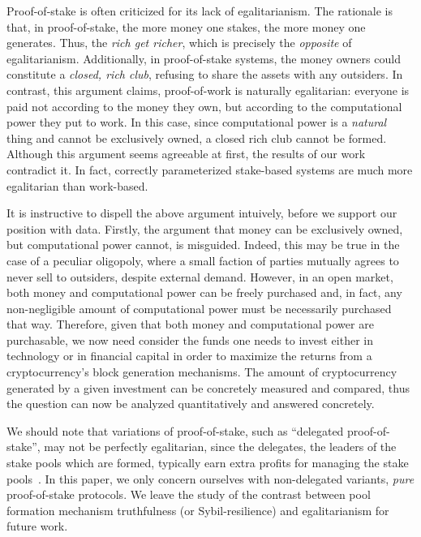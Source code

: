 
Proof-of-stake is often criticized for its lack of egalitarianism. The
rationale is that, in proof-of-stake, the more money one stakes, the more money
one generates. Thus, the \emph{rich get richer}, which is precisely the
\emph{opposite} of egalitarianism. Additionally, in proof-of-stake systems, the
money owners could constitute a \emph{closed, rich club}, refusing to share the
assets with any outsiders.  In contrast, this argument claims, proof-of-work is
naturally egalitarian: everyone is paid not according to the money they own,
but according to the computational power they put to work. In this case, since
computational power is a \emph{natural} thing and cannot be exclusively owned,
a closed rich club cannot be formed.
Although this argument seems agreeable at first, the results of our work contradict it.
In fact, correctly parameterized stake-based systems are much more egalitarian than work-based.

It is instructive to dispell the above argument intuively, before we support
our position with data. Firstly, the argument that money can be exclusively
owned, but computational power cannot, is misguided. Indeed, this may be true
in the case of a peculiar oligopoly, where a small faction of parties mutually
agrees to never sell to outsiders, despite external demand. However, in an open
market, both money and computational power can be freely purchased and, in
fact, any non-negligible amount of computational power must be necessarily
purchased that way. Therefore, given that both money and computational power
are purchasable, we now need consider the funds one needs to invest either in
technology or in financial capital in order to maximize the returns from a
cryptocurrency's block generation mechanisms. The amount of cryptocurrency
generated by a given investment can be concretely measured and compared, thus
the question can now be analyzed quantitatively and answered concretely.

We should
note that variations of proof-of-stake, such as ``delegated proof-of-stake'',
may not be perfectly egalitarian, since the delegates, \ie the leaders of
the stake pools which are formed, typically earn extra profits for managing the
stake pools~\cite{stouka-koutsoupias-kiayias}. In this paper, we only concern
ourselves with non-delegated variants, \ie \emph{pure} proof-of-stake protocols.
We leave the study of the contrast between pool formation mechanism truthfulness
(or Sybil-resilience) and egalitarianism for future work.
